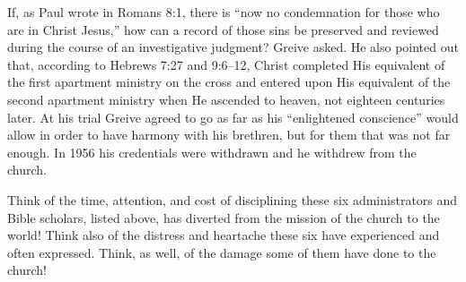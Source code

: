 If, as Paul wrote in Romans 8:1, there is ``now no condemnation for those who
are in Christ Jesus,'' how can a record of those sins be preserved and
reviewed during the course of an investigative judgment? Greive asked. He
also pointed out that, according to Hebrews 7:27 and 9:6--12, Christ
completed His equivalent of the first apartment ministry on the cross and
entered upon His equivalent of the second apartment ministry when He
ascended to heaven, not eighteen centuries later. At his trial Greive agreed
to go as far as his ``enlightened conscience'' would allow in order to have 
harmony with his brethren, but for them that was not far enough. In 1956 his
credentials were withdrawn and he withdrew from the church.

Think of the time, attention, and cost of disciplining these six
administrators and Bible scholars, listed above, has diverted from the
mission of the church to the world! Think also of the distress and heartache
these six have experienced and often expressed. Think, as well, of the
damage some of them have done to the church! 
